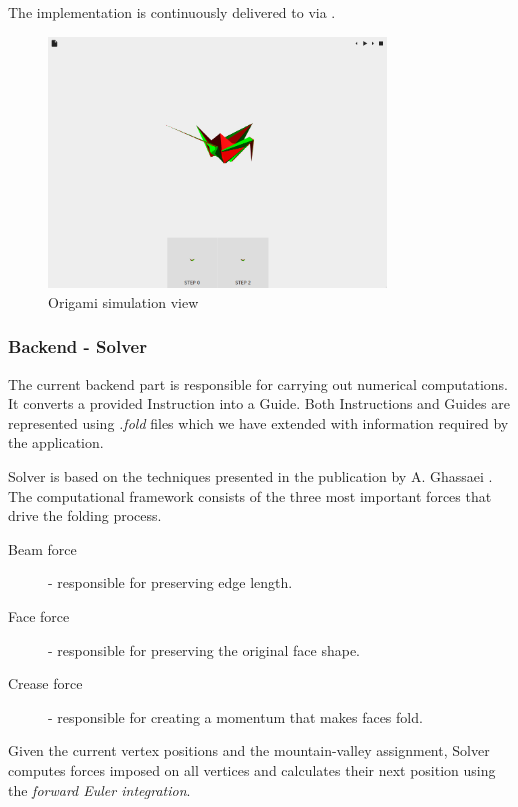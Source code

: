 The implementation is continuously delivered to  via .


\begin{figure}[h]
\caption{Origami simulation view}
  \centering
    \includegraphics[width=0.8\textwidth]{assets/prototype-front.png}
\end{figure}

\subsubsection{Backend - Solver}

The current backend part is responsible for carrying out numerical computations.
It converts a provided Instruction into a Guide.
Both Instructions and Guides are represented using \textit{.fold} files which we have extended with information required by the application.
\smallskip

Solver is based on the techniques presented in the publication by A. Ghassaei \cite{origami-simulator:paper}.
The computational framework consists of the three most important forces that drive the folding process.

\begin{description}
	\item[Beam force] - responsible for preserving edge length.
	\item[Face force] - responsible for preserving the original face shape.
	\item[Crease force] - responsible for creating a momentum that makes faces fold.
\end{description}

Given the current vertex positions and the mountain-valley assignment,
Solver computes forces imposed on all vertices and calculates their next position
using the \textit{forward Euler integration}.

